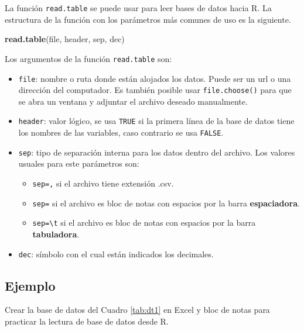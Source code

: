 \documentclass[10pt,]{krantz}
\makeatletter
\newenvironment{Shaded}{\begin{snugshade}}{\end{snugshade}}
\newcommand{\KeywordTok}[1]{\textcolor[rgb]{0.13,0.29,0.53}{\textbf{{#1}}}}
\newcommand{\NormalTok}[1]{{#1}}
\providecommand{\tightlist}{%
  \setlength{\itemsep}{0pt}\setlength{\parskip}{0pt}}
\let\proglang=\textsf
\newenvironment{kframe}{%
\medskip{}
\setlength{\fboxsep}{.8em}
 \def\at@end@of@kframe{}%
 \ifinner\ifhmode%
  \def\at@end@of@kframe{\end{minipage}}%
  \begin{minipage}{\columnwidth}%
 \fi\fi%
 \def\FrameCommand##1{\hskip\@totalleftmargin \hskip-\fboxsep
 \colorbox{shadecolor}{##1}\hskip-\fboxsep
     \hskip-\linewidth \hskip-\@totalleftmargin \hskip\columnwidth}%
 \MakeFramed {\advance\hsize-\width
   \@totalleftmargin\z@ \linewidth\hsize
   \@setminipage}}%
 {\par\unskip\endMakeFramed%
 \at@end@of@kframe}
\renewenvironment{Shaded}{\begin{kframe}}{\end{kframe}}
\makeatother
\begin{document}
La función \texttt{read.table} se puede usar para leer bases de datos
hacia \proglang{R}. La estructura de la función con los parámetros más
comunes de uso es la siguiente.

\begin{Shaded}
\begin{Highlighting}[]
\KeywordTok{read.table}\NormalTok{(file, header, sep, dec)}
\end{Highlighting}
\end{Shaded}

Los argumentos de la función \texttt{read.table} son:

\begin{itemize}
\tightlist
\item
  \texttt{file}: nombre o ruta donde están alojados los datos. Puede ser
  un url o una dirección del computador. Es también posible usar
  \texttt{file.choose()} para que se abra un ventana y adjuntar el
  archivo deseado manualmente.
\item
  \texttt{header}: valor lógico, se usa \texttt{TRUE} si la primera
  línea de la base de datos tiene los nombres de las variables, caso
  contrario se usa \texttt{FALSE}.
\item
  \texttt{sep}: tipo de separación interna para los datos dentro del
  archivo. Los valores usuales para este parámetros son:

  \begin{itemize}
  \tightlist
  \item
    \texttt{sep=\textquotesingle{},\textquotesingle{}} si el archivo
    tiene extensión .csv.
  \item
    \texttt{sep=\textquotesingle{}\textquotesingle{}} si el archivo es
    bloc de notas con espacios por la barra \textbf{espaciadora}.
  \item
    \texttt{sep=\textquotesingle{}\textbackslash{}t\textquotesingle{}}
    si el archivo es bloc de notas con espacios por la barra
    \textbf{tabuladora}.
  \end{itemize}
\item
  \texttt{dec}: símbolo con el cual están indicados los decimales.
\end{itemize}

\subsection*{Ejemplo}\label{ejemplo-24}


Crear la base de datos del Cuadro \ref{tab:dt1} en Excel y bloc de notas
para practicar la lectura de base de datos desde \proglang{R}.
\end{document}
